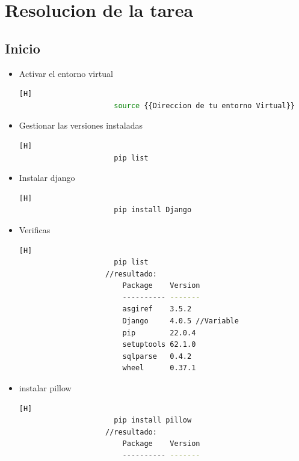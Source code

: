 \documentclass{article}
\begin{document}
	\section{Resolucion de la tarea}
    \subsection{Inicio}
    \begin{itemize}
        \item Activar el entorno virtual
        \begin{lstlisting}[language=bash,caption={Entorno de Linux-Ejecute el script de activación para activar el entorno virtual:}][H]
    		          source {{Direccion de tu entorno Virtual}}
    	\end{lstlisting}
         \item Gestionar las versiones instaladas
        \begin{lstlisting}[language=bash,caption={Entorno de Linux-Ejecute el script de activación para activar el entorno virtual:}][H]
    		          pip list
    	\end{lstlisting}
        \item Instalar django
        \begin{lstlisting}[language=bash,caption={Entorno de Linux-Ejecute el script de activación para activar el entorno virtual:}][H]
    		          pip install Django
    	\end{lstlisting}
        \item Verificas
        \begin{lstlisting}[language=bash,caption={Entorno de Linux-Ejecute el script de activación para activar el entorno virtual:}][H]
    		          pip list
                    //resultado:
                        Package    Version
                        ---------- -------
                        asgiref    3.5.2
                        Django     4.0.5 //Variable
                        pip        22.0.4
                        setuptools 62.1.0
                        sqlparse   0.4.2
                        wheel      0.37.1
    	\end{lstlisting}
        \item instalar pillow
        \begin{lstlisting}[language=bash,caption={Entorno de Linux-Ejecute el script de activación para activar el entorno virtual:}][H]
    		          pip install pillow
                    //resultado:
                        Package    Version
                        ---------- -------

\end{lstlisting}
\end{itemize}
\end{document}
